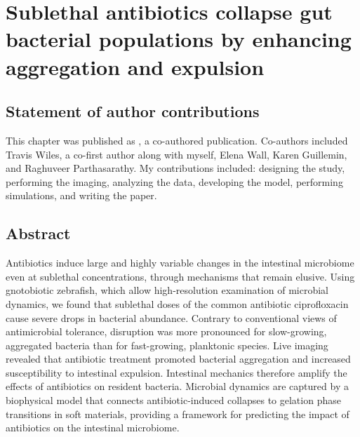 
\def\reals{\mathbb{R}}
\def\be{\begin{equation}}
\def\ee{\end{equation}}
\def\bea{\begin{eqnarray}}
\def\eea{\end{eqnarray}}
\def\bml{\begin{mathletters}}
\def\eml{\end{mathletters}}
\def\bse{\begin{subequations}}
\def\ese{\end{subequations}}
\def\expec{\mathbb{E}}
\def\exp{\text{exp}}
\def\Var{\text{Var}}
\def\e{\text{e}}
\def\ba{\begin{align}}
\def\ea{\end{align}}

\chapter{Sublethal antibiotics collapse gut bacterial populations by enhancing aggregation and expulsion}
\label{ch:abx}

\section{Statement of author contributions}
This chapter was published as \cite{schlomann_sublethal_2019}, a co-authored publication. Co-authors included Travis Wiles, a co-first author along with myself, Elena Wall, Karen Guillemin, and Raghuveer Parthasarathy. My contributions included: designing the study, performing the imaging, analyzing the data, developing the model, performing simulations, and writing the paper. 

\section{Abstract}
Antibiotics induce large and highly variable changes in the intestinal microbiome even at sublethal concentrations, through mechanisms that remain elusive. Using gnotobiotic zebrafish, which allow high-resolution examination of microbial dynamics, we found that sublethal doses of the common antibiotic ciprofloxacin cause severe drops in bacterial abundance. Contrary to conventional views of antimicrobial tolerance, disruption was more pronounced for slow-growing, aggregated bacteria than for fast-growing, planktonic species. Live imaging revealed that antibiotic treatment promoted bacterial aggregation and increased susceptibility to intestinal expulsion. Intestinal mechanics therefore amplify the effects of antibiotics on resident bacteria. Microbial dynamics are captured by a biophysical model that connects antibiotic-induced collapses to gelation phase transitions in soft materials, providing a framework for predicting the impact of antibiotics on the intestinal microbiome.












